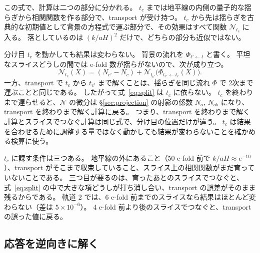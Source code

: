\documentclass[a4paper,11pt]{ltjsarticle}
\begin{document}
この式で、計算は二つの部分に分かれる。
$t_c$ までは地平線の内側の量子的な揺らぎから相関関数を作る部分で、transport が受け持つ。
$t_c$ から先は揺らぎを古典的な初期値として背景の方程式で運ぶ部分で、その効果はすべて関数 $\mathcal N_{t_c}$ に入る。
落としているのは $(k/aH)^2$ だけで、どちらの部分も近似ではない。

分け目 $t_c$ を動かしても結果は変わらない。
背景の流れを $\Phi_{t'\leftarrow t}$ と書く。
平坦なスライスどうしの間では e-fold 数が揺らがないので、次が成り立つ。
\begin{equation}
\mathcal N_{t_c}(X)=(N_{c'}-N_c)+\mathcal N_{t_{c'}}\big(\Phi_{t_{c'}\leftarrow t_c}(X)\big) .
\end{equation}
一方、transport で $t_c$ から $t_{c'}$ まで解くことは、揺らぎを同じ流れ $\Phi$ で 2次まで運ぶことと同じである。
したがって式~\eqref{eq:split} は $t_c$ に依らない。
$t_c$ を終わりまで遅らせると、$\mathcal N$ の微分は \S\ref{sec:projection} の射影の係数 $N_a$, $N_{ab}$ になり、transport を終わりまで解く計算に戻る。
つまり、transport を終わりまで解く計算とスライスでつなぐ計算は同じ式で、分け目の位置だけが違う。
$t_c$ は結果を合わせるために調整する量ではなく動かしても結果が変わらないことを確かめる検算に使う。

$t_c$ に課す条件は三つある。
地平線の外にあること（50 e-fold 前で $k/aH\approx e^{-10}$）、transport がそこまで収束していること、スライス上の相関関数がまだ育っていないことである。
三つ目が要るのは、育ったあとのスライスでつなぐと、式~\eqref{eq:split} の中で大きな項どうしが打ち消し合い、transport の誤差がそのまま残るからである。
軌道 2 では、6 e-fold 前までのスライスなら結果はほとんど変わらない（差は $5\times10^{-6}$）。
4 e-fold 前より後のスライスでつなぐと、transport の誤った値に戻る。

\subsection{応答を逆向きに解く}
\end{document}

